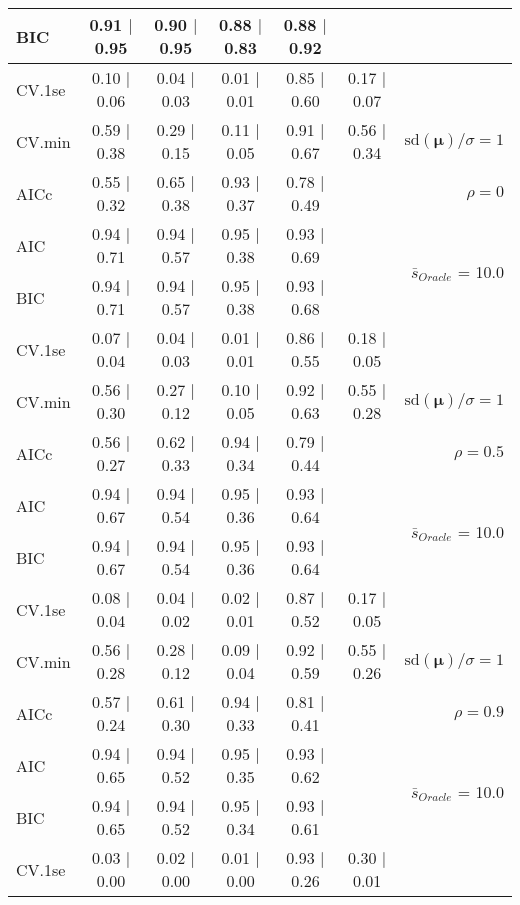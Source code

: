 \begin{table}
\begin{center}
\begin{tabular}{l*{5}{c}|r}
BIC & 0.91 $\mid$ 0.95 & 0.90 $\mid$ 0.95 & 0.88 $\mid$ 0.83 & 0.88 $\mid$ 0.92 & &  \\
 \hline 
CV.1se & 0.10 $\mid$ 0.06 & 0.04 $\mid$ 0.03 & 0.01 $\mid$ 0.01 & 0.85 $\mid$ 0.60 & 0.17 $\mid$ 0.07 & \\
CV.min & 0.59 $\mid$ 0.38 & 0.29 $\mid$ 0.15 & 0.11 $\mid$ 0.05 & 0.91 $\mid$ 0.67 & 0.56 $\mid$ 0.34 &  $\mathrm{sd}(\mathbf{\mu})/\sigma=1$ \\
AICc & 0.55 $\mid$ 0.32 & 0.65 $\mid$ 0.38 & 0.93 $\mid$ 0.37 & 0.78 $\mid$ 0.49 & & $\rho=0$ \\
AIC & 0.94 $\mid$ 0.71 & 0.94 $\mid$ 0.57 & 0.95 $\mid$ 0.38 & 0.93 $\mid$ 0.69 & &  \multirow{2}{*}{$\bar{s}_{Oracle}$ = 10.0} \\
BIC & 0.94 $\mid$ 0.71 & 0.94 $\mid$ 0.57 & 0.95 $\mid$ 0.38 & 0.93 $\mid$ 0.68 & &  \\
 \hline 
CV.1se & 0.07 $\mid$ 0.04 & 0.04 $\mid$ 0.03 & 0.01 $\mid$ 0.01 & 0.86 $\mid$ 0.55 & 0.18 $\mid$ 0.05 & \\
CV.min & 0.56 $\mid$ 0.30 & 0.27 $\mid$ 0.12 & 0.10 $\mid$ 0.05 & 0.92 $\mid$ 0.63 & 0.55 $\mid$ 0.28 &  $\mathrm{sd}(\mathbf{\mu})/\sigma=1$ \\
AICc & 0.56 $\mid$ 0.27 & 0.62 $\mid$ 0.33 & 0.94 $\mid$ 0.34 & 0.79 $\mid$ 0.44 & & $\rho=0.5$ \\
AIC & 0.94 $\mid$ 0.67 & 0.94 $\mid$ 0.54 & 0.95 $\mid$ 0.36 & 0.93 $\mid$ 0.64 & &  \multirow{2}{*}{$\bar{s}_{Oracle}$ = 10.0} \\
BIC & 0.94 $\mid$ 0.67 & 0.94 $\mid$ 0.54 & 0.95 $\mid$ 0.36 & 0.93 $\mid$ 0.64 & &  \\
 \hline 
CV.1se & 0.08 $\mid$ 0.04 & 0.04 $\mid$ 0.02 & 0.02 $\mid$ 0.01 & 0.87 $\mid$ 0.52 & 0.17 $\mid$ 0.05 & \\
CV.min & 0.56 $\mid$ 0.28 & 0.28 $\mid$ 0.12 & 0.09 $\mid$ 0.04 & 0.92 $\mid$ 0.59 & 0.55 $\mid$ 0.26 &  $\mathrm{sd}(\mathbf{\mu})/\sigma=1$ \\
AICc & 0.57 $\mid$ 0.24 & 0.61 $\mid$ 0.30 & 0.94 $\mid$ 0.33 & 0.81 $\mid$ 0.41 & & $\rho=0.9$ \\
AIC & 0.94 $\mid$ 0.65 & 0.94 $\mid$ 0.52 & 0.95 $\mid$ 0.35 & 0.93 $\mid$ 0.62 & &  \multirow{2}{*}{$\bar{s}_{Oracle}$ = 10.0} \\
BIC & 0.94 $\mid$ 0.65 & 0.94 $\mid$ 0.52 & 0.95 $\mid$ 0.34 & 0.93 $\mid$ 0.61 & &  \\
 \hline 
CV.1se & 0.03 $\mid$ 0.00 & 0.02 $\mid$ 0.00 & 0.01 $\mid$ 0.00 & 0.93 $\mid$ 0.26 & 0.30 $\mid$ 0.01 & \\

\end{tabular}
\end{center}
\end{table}
